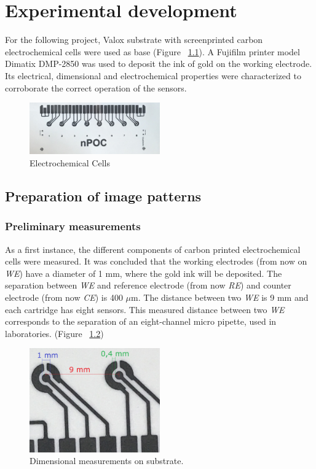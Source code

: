\chapter{Experimental development}
For the following project, Valox substrate with screenprinted carbon electrochemical cells were used as base (Figure ~\ref{fig:Figura_Electrodos_nPOC}). A Fujifilm printer model Dimatix DMP-2850 was used to deposit the ink of gold on the working electrode. Its electrical, dimensional and electrochemical properties were characterized to corroborate the correct operation of the sensors.

\begin{figure}[H]
  \centering
    \includegraphics[width=0.5\textwidth]{Figures/Figura_Electrodos_nPOC}
  \caption{Electrochemical Cells}
  \label{fig:Figura_Electrodos_nPOC}
\end{figure}

\section{Preparation of image patterns}

\subsection{Preliminary measurements}
As a first instance, the different components of carbon printed electrochemical cells were measured. It was concluded that the working electrodes (from now on \emph{WE}) have a diameter of 1 mm, where the gold ink will be deposited. The separation between \emph{WE} and reference electrode (from now \emph{RE}) and counter electrode (from now \emph{CE}) is 400 $\mu$m. The distance between two \emph{WE} is 9 mm and each cartridge has eight sensors. This measured distance between two \emph{WE} corresponds to the separation of an eight-channel micro pipette, used in laboratories. (Figure ~\ref{fig:Figura_medicion_celdas})

\begin{figure}[H]
  \centering
    \includegraphics[width=0.5\textwidth]{Figures/Figura_medicion_celdas}
  \caption{Dimensional measurements on substrate.}
  \label{fig:Figura_medicion_celdas}
\end{figure}


